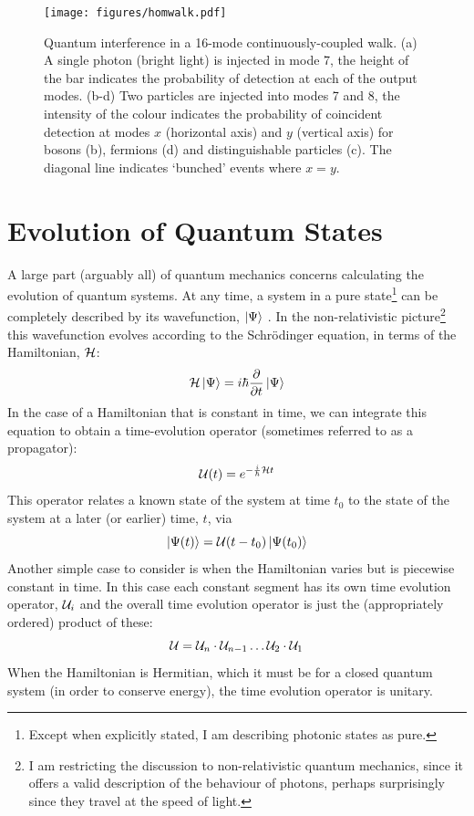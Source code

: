 \begin{figure}
  \centering
  \texttt{[image: figures/homwalk.pdf]}
  \caption[Quantum interference in a continuously-coupled walk]
  {Quantum interference in a 16-mode continuously-coupled walk. (a) A single
  photon (bright light) is injected in mode 7, the height of the bar indicates
  the probability of detection at each of the output modes. (b-d) Two particles
  are injected into modes 7 and 8, the intensity of the colour indicates the
  probability of coincident detection at modes \(x\) (horizontal axis) and \(y\)
  (vertical axis) for bosons (b), fermions (d) and distinguishable particles
  (c). The diagonal line indicates `bunched' events where \(x=y\).}
  \label{fig:HoMWalk}
\end{figure}

\section{Evolution of Quantum States}
\label{sec:Evolution}
A large part (arguably all) of quantum mechanics concerns
calculating the evolution of quantum systems. At any time, a system in a pure
state\footnote{Except when explicitly stated, I am describing photonic states as
pure.} can be completely described by
its wavefunction, \(\left|\Psi\right\rangle\) \cite{pbr}. In the non-relativistic
picture\footnote{I am restricting the discussion to non-relativistic quantum
mechanics, since it offers a valid description of the behaviour of photons,
perhaps surprisingly since they travel at the speed of light.} this
wavefunction evolves according to the Schr\"odinger equation, in terms of the
Hamiltonian, \(\mathcal{H}\):
\begin{equation}
  \mathcal{H} \left|\Psi\right\rangle = i \hbar \frac{\partial}{\partial t} \left|\Psi\right\rangle
\end{equation}
In the case of a Hamiltonian that is constant in time, we can integrate this
equation to obtain a time-evolution operator (sometimes referred to as a
propagator):
\begin{equation}
  \label{eq:expiht}
  \mathcal{U} \!\left(t\right) = e^{-\frac{i}{\hbar} \mathcal{H} t}
\end{equation}
This operator relates a known state of the system at time \(t_{0}\) to the state
of the system at a later (or earlier) time, \(t\), via
\begin{equation}
  \left| \Psi \!\left(t\right) \right\rangle = \mathcal{U} \!\left(t-t_{0}\right) \left| \Psi \!\left(t_{0}\right) \right\rangle
\end{equation}
Another simple case to consider is when the Hamiltonian varies but is piecewise
constant in time. In this case each constant segment has its own time evolution
operator, \(\mathcal{U}_{i}\) and  the overall time evolution operator is just the
(appropriately ordered) product of these:
\begin{equation}
  \mathcal{U} = \mathcal{U}_{n} \cdot \mathcal{U}_{n-1} \dots \mathcal{U}_{2} \cdot \mathcal{U}_{1}
\end{equation}
When the Hamiltonian is Hermitian, which it must be for a closed quantum system
(in order to conserve energy), the time evolution operator is unitary.

